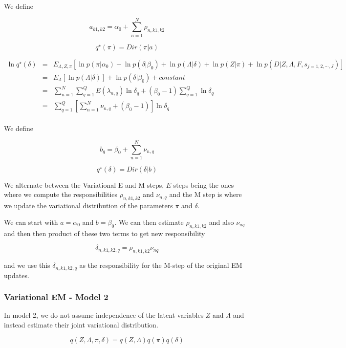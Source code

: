 \documentclass[11pt,authoryear]{article}
\begin{document}
We define 

$$ a_{k1,k2} = \alpha_0 + \sum_{n=1}^{N} \rho_{n,k1,k2} $$

$$ q^{\star} (\pi) = Dir(\pi | a)  $$


\begin{eqnarray} \nonumber
\ln q^{\star} (\delta) & = & E_{\Lambda, Z, \pi} \left [ \ln p(\pi|\alpha_0)+ \ln p(\delta | \beta_0) + \ln p(\Lambda | \delta) + \ln p(Z | \pi) + \ln p(D | Z, \Lambda, F, s_{j=1,2,\cdots,J}) \right ] \\  \nonumber
  & = & E_{\Lambda} \left [ \ln p(\Lambda | \delta) \right] + \ln p(\delta | \beta_0) + constant \\ \nonumber
  & = & \sum_{n=1}^{N}\sum_{q=1}^{Q} E(\lambda_{n,q}) \ln \delta_{q} + (\beta_0 -1) \sum_{q=1}^{Q} \ln \delta_{q} \\ \nonumber
  & = & \sum_{q=1}^{Q} \left [ \sum_{n=1}^{N} \nu_{n,q} + (\beta_0 -1) \right] \ln \delta_{q} \\ \nonumber
\end{eqnarray}

We define 

$$ b_{q} = \beta_0 + \sum_{n=1}^{N} \nu_{n,q} $$

$$ q^{\star} (\delta) = Dir(\delta | b)  $$


We alternate between the Variational E and M steps, $E$ steps being the ones where we compute the responsibilities $\rho_{n,k1,k2}$ and $\nu_{n,q}$ and the M step is where we update the variational distribution of the parameters $\pi$ and $\delta$. 

We can start with $a= \alpha_0$ and $b=\beta_0$. We can then estimate $\rho_{n,k1,k2}$ and also $\nu_{nq}$ and then then product of these two terms to get new responsibility

$$ \delta_{n, k1, k2, q} = \rho_{n, k1, k2} \nu_{nq} $$

and we use this $\delta_{n, k1, k2, q}$ as the responsibility for the M-step of the original EM updates. 

\subsubsection{Variational EM  - Model 2}

In model 2, we do not assume independence of the latent variables $Z$ and $\Lambda$ and instead estimate their joint variational distribution. 

$$ q(Z, \Lambda, \pi, \delta) = q(Z, \Lambda) q(\pi) q(\delta) $$
\end{document}
